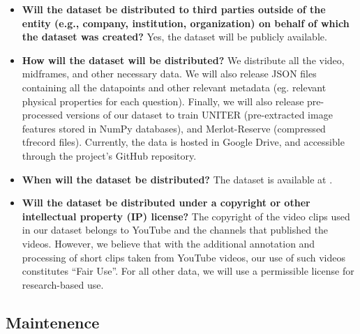 \documentclass[runningheads]{llncs}
\begin{document}
\begin{itemize}
\item \textbf{Will the dataset be distributed to third parties outside of the entity (e.g., company, institution, organization) on behalf of which the
dataset was created?} Yes, the dataset will be publicly available. 

    \item \textbf{How will the dataset will be distributed?} We distribute all the video, midframes, and other necessary data. We will also release JSON files containing all the datapoints and other relevant metadata (eg. relevant physical properties for each question). Finally, we will also release pre-processed versions of our dataset to train UNITER (pre-extracted image features stored in NumPy databases), and Merlot-Reserve (compressed tfrecord files). Currently, the data is hosted in Google Drive, and accessible through the project's GitHub repository.  
    

\item \textbf{When will the dataset be distributed?}  The dataset is available at \href{https://github.com/samuelyu2002/PACS}{}.

\item \textbf{Will the dataset be distributed under a copyright or other intellectual property (IP) license?} The copyright of the video clips used in our dataset belongs to YouTube and the channels that published the videos. However, we believe that with the additional annotation and processing of short clips taken from YouTube videos, our use of such videos constitutes ``Fair Use''. 
For all other data, we will use a permissible license for research-based use. 

\end{itemize}

\subsection{Maintenence} 
\end{document}
